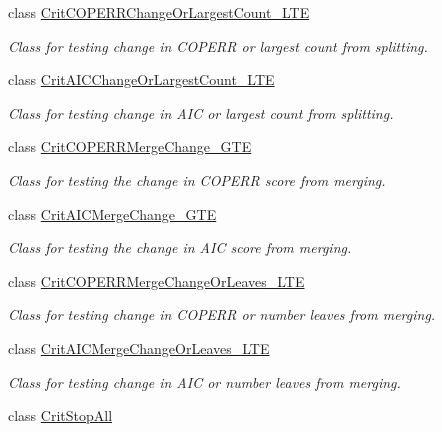 \begin{DoxyCompactItemize}
class \hyperlink{classsubpavings_1_1CritCOPERRChangeOrLargestCount__LTE}{\-Crit\-C\-O\-P\-E\-R\-R\-Change\-Or\-Largest\-Count\-\_\-\-L\-T\-E}
\begin{DoxyCompactList}\small\item\em \-Class for testing change in \-C\-O\-P\-E\-R\-R or largest count from splitting. \end{DoxyCompactList}\item 
class \hyperlink{classsubpavings_1_1CritAICChangeOrLargestCount__LTE}{\-Crit\-A\-I\-C\-Change\-Or\-Largest\-Count\-\_\-\-L\-T\-E}
\begin{DoxyCompactList}\small\item\em \-Class for testing change in \-A\-I\-C or largest count from splitting. \end{DoxyCompactList}\item 
class \hyperlink{classsubpavings_1_1CritCOPERRMergeChange__GTE}{\-Crit\-C\-O\-P\-E\-R\-R\-Merge\-Change\-\_\-\-G\-T\-E}
\begin{DoxyCompactList}\small\item\em \-Class for testing the change in \-C\-O\-P\-E\-R\-R score from merging. \end{DoxyCompactList}\item 
class \hyperlink{classsubpavings_1_1CritAICMergeChange__GTE}{\-Crit\-A\-I\-C\-Merge\-Change\-\_\-\-G\-T\-E}
\begin{DoxyCompactList}\small\item\em \-Class for testing the change in \-A\-I\-C score from merging. \end{DoxyCompactList}\item 
class \hyperlink{classsubpavings_1_1CritCOPERRMergeChangeOrLeaves__LTE}{\-Crit\-C\-O\-P\-E\-R\-R\-Merge\-Change\-Or\-Leaves\-\_\-\-L\-T\-E}
\begin{DoxyCompactList}\small\item\em \-Class for testing change in \-C\-O\-P\-E\-R\-R or number leaves from merging. \end{DoxyCompactList}\item 
class \hyperlink{classsubpavings_1_1CritAICMergeChangeOrLeaves__LTE}{\-Crit\-A\-I\-C\-Merge\-Change\-Or\-Leaves\-\_\-\-L\-T\-E}
\begin{DoxyCompactList}\small\item\em \-Class for testing change in \-A\-I\-C or number leaves from merging. \end{DoxyCompactList}\item 
class \hyperlink{classsubpavings_1_1CritStopAll}{\-Crit\-Stop\-All}

\end{DoxyCompactItemize}
